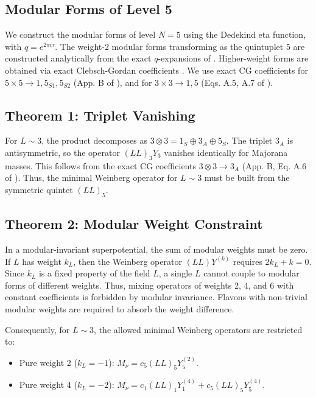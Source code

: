 \documentclass[11pt, a4paper]{article}
\begin{document}
\subsection{Modular Forms of Level 5}
We construct the modular forms of level \(N=5\) using the Dedekind eta function, with \(q = e^{2\pi i \tau}\). The weight-2 modular forms transforming as the quintuplet \(5\) are constructed analytically from the exact \(q\)-expansions of \cite{Ding:2019}. Higher-weight forms are obtained via exact Clebsch-Gordan coefficients \cite{Novichkov:2018}. We use exact CG coefficients for \(5\times 5 \to 1, 5_{S1}, 5_{S2}\) (App. B of \cite{Novichkov:2018}), and for \(3\times 3 \to 1, 5\) (Eqs. A.5, A.7 of \cite{Novichkov:2018}).

\subsection{Theorem 1: Triplet Vanishing}
For \(L \sim 3\), the product decomposes as \(3 \otimes 3 = 1_S \oplus 3_A \oplus 5_S\). The triplet \(3_A\) is antisymmetric, so the operator \((LL)_3 Y_3\) vanishes identically for Majorana masses. This follows from the exact CG coefficients \(3\otimes 3 \to 3_A\) (App. B, Eq. A.6 of \cite{Novichkov:2018}). Thus, the minimal Weinberg operator for \(L\sim 3\) must be built from the symmetric quintet \((LL)_5\).

\subsection{Theorem 2: Modular Weight Constraint}
In a modular-invariant superpotential, the sum of modular weights must be zero. If \(L\) has weight \(k_L\), then the Weinberg operator \((LL) Y^{(k)}\) requires \(2k_L + k = 0\). Since \(k_L\) is a fixed property of the field \(L\), a single \(L\) cannot couple to modular forms of different weights. Thus, mixing operators of weights 2, 4, and 6 with constant coefficients is forbidden by modular invariance. Flavons with non-trivial modular weights are required to absorb the weight difference.

Consequently, for \(L \sim 3\), the allowed minimal Weinberg operators are restricted to:
\begin{itemize}
    \item Pure weight 2 (\(k_L = -1\)): \(M_\nu = c_5 (LL)_5 Y_5^{(2)}\).
    \item Pure weight 4 (\(k_L = -2\)): \(M_\nu = c_1 (LL)_1 Y_1^{(4)} + c_5 (LL)_5 Y_5^{(4)}\).
\end{itemize}
\end{document}

